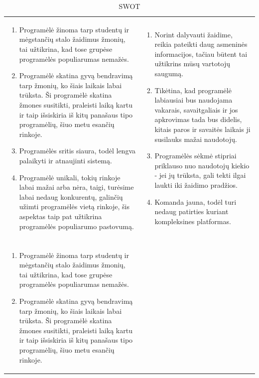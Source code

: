 \documentclass{VUMIFPSkursinis}
\begin{document}
			\begin{longtable}{ | m{8cm} | m{8cm} | }
			\caption{SWOT}
			\label{variability_impl_mech}
			\endhead
			 \hline			

			\centering{\textbf{Stiprybės}} & \centering{\textbf{Silpnybės}} \tabularnewline \hline
				\begin{enumerate}
					\item Programėlė žinoma tarp studentų ir mėgstančių stalo žaidimus žmonių, tai užtikrina, kad tose grupėse programėlės populiarumas nemažės.
					\item Programėlė skatina gyvą bendravimą tarp žmonių, ko šiais laikais labai trūksta. Ši programėlė skatina žmones susitikti, praleisti laiką kartu ir taip išsiskiria iš kitų panašaus tipo programėlių, šiuo metu esančių rinkoje.
					\item Programėlės sritis siaura, todėl lengva palaikyti ir atnaujinti sistemą.
					\item Programėlė unikali, tokių rinkoje labai mažai arba nėra, taigi, turėsime labai nedaug konkurentų, galinčių užimti programėlės vietą rinkoje, šis aspektas taip pat užtikrina programėlės populiarumo pastovumą.
				\end{enumerate}
					& 
				\begin{enumerate}
					\item Norint dalyvauti žaidime, reikia pateikti daug asmeninės informacijos, tačiau būtent tai užtikrins mūsų vartotojų saugumą.
					\item Tikėtina, kad programėlė labiausiai bus naudojama vakarais, savaitgaliais ir jos apkrovimas tada bus didelis, kitais paros ir savaitės laikais ji susilauks mažai naudotojų.
					\item Programėlės sėkmė stipriai priklauso nuo naudotojų kiekio - jei jų trūksta, gali tekti ilgai laukti iki žaidimo pradžios. 
					\item Komanda jauna, todėl turi nedaug patirties kuriant kompleksines platformas.
				\end{enumerate}\tabularnewline \hline
			\centering{\textbf{Galimybės}} & \centering{\textbf{Grėsmės}} \tabularnewline \hline
				\begin{enumerate}
					\item Programėlė žinoma tarp studentų ir mėgstančių stalo žaidimus žmonių, tai užtikrina, kad tose grupėse programėlės populiarumas nemažės.
					\item Programėlė skatina gyvą bendravimą tarp žmonių, ko šiais laikais labai trūksta. Ši programėlė skatina žmones susitikti, praleisti laiką kartu ir taip išsiskiria iš kitų panašaus tipo programėlių, šiuo metu esančių rinkoje.

\end{enumerate}
\end{longtable}
\end{document}
